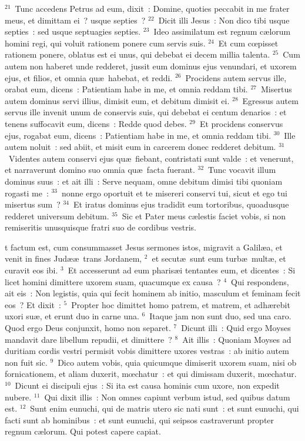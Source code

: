 ${}^{21}$~Tunc accedens Petrus ad eum, dixit~: Domine, quoties peccabit in me frater meus, et dimittam ei~? usque septies~?
${}^{22}$~Dicit illi Jesus~: Non dico tibi usque septies~: sed usque septuagies septies.
${}^{23}$~Ideo assimilatum est regnum c\ae lorum homini regi, qui voluit rationem ponere cum servis suis.
${}^{24}$~Et cum cœpisset rationem ponere, oblatus est ei unus, qui debebat ei decem millia talenta.
${}^{25}$~Cum autem non haberet unde redderet, jussit eum dominus ejus venundari, et uxorem ejus, et filios, et omnia qu\ae\ habebat, et reddi.
${}^{26}$~Procidens autem servus ille, orabat eum, dicens~: Patientiam habe in me, et omnia reddam tibi.
${}^{27}$~Misertus autem dominus servi illius, dimisit eum, et debitum dimisit ei.
${}^{28}$~Egressus autem servus ille invenit unum de conservis suis, qui debebat ei centum denarios~: et tenens suffocavit eum, dicens~: Redde quod debes.
${}^{29}$~Et procidens conservus ejus, rogabat eum, dicens~: Patientiam habe in me, et omnia reddam tibi.
${}^{30}$~Ille autem noluit~: sed abiit, et misit eum in carcerem donec redderet debitum.
${}^{31}$~Videntes autem conservi ejus qu\ae\ fiebant, contristati sunt valde~: et venerunt, et narraverunt domino suo omnia qu\ae\ facta fuerant.
${}^{32}$~Tunc vocavit illum dominus suus~: et ait illi~: Serve nequam, omne debitum dimisi tibi quoniam rogasti me~:
${}^{33}$~nonne ergo oportuit et te misereri conservi tui, sicut et ego tui misertus sum~?
${}^{34}$~Et iratus dominus ejus tradidit eum tortoribus, quoadusque redderet universum debitum.
${}^{35}$~Sic et Pater meus c\ae lestis faciet vobis, si non remiseritis unusquisque fratri suo de cordibus vestris.

\bchapter
{}t factum est, cum consummasset Jesus sermones istos, migravit a Galil\ae a, et venit in fines Jud\ae \ae\ trans Jordanem,
${}^{2}$~et secut\ae\ sunt eum turb\ae\ mult\ae , et curavit eos ibi.
${}^{3}$~Et accesserunt ad eum pharis\ae i tentantes eum, et dicentes~: Si licet homini dimittere uxorem suam, quacumque ex causa~?
${}^{4}$~Qui respondens, ait eis~: Non legistis, quia qui fecit hominem ab initio, masculum et feminam fecit eos~? Et dixit~:
${}^{5}$~Propter hoc dimittet homo patrem, et matrem, et adh\ae rebit uxori su\ae , et erunt duo in carne una.
${}^{6}$~Itaque jam non sunt duo, sed una caro. Quod ergo Deus conjunxit, homo non separet.
${}^{7}$~Dicunt illi~: Quid ergo Moyses mandavit dare libellum repudii, et dimittere~?
${}^{8}$~Ait illis~: Quoniam Moyses ad duritiam cordis vestri permisit vobis dimittere uxores vestras~: ab initio autem non fuit sic.
${}^{9}$~Dico autem vobis, quia quicumque dimiserit uxorem suam, nisi ob fornicationem, et aliam duxerit, mœchatur~: et qui dimissam duxerit, mœchatur.
${}^{10}$~Dicunt ei discipuli ejus~: Si ita est causa hominis cum uxore, non expedit nubere.
${}^{11}$~Qui dixit illis~: Non omnes capiunt verbum istud, sed quibus datum est.
${}^{12}$~Sunt enim eunuchi, qui de matris utero sic nati sunt~: et sunt eunuchi, qui facti sunt ab hominibus~: et sunt eunuchi, qui seipsos castraverunt propter regnum c\ae lorum. Qui potest capere capiat.


